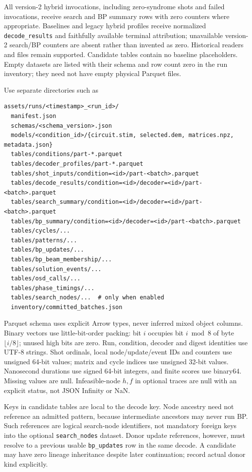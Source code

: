 \documentclass[11pt,a4paper]{article}
\newcommand{\code}[1]{\nolinkurl{#1}}
\begin{document}
All version-2 hybrid invocations, including zero-syndrome shots and failed invocations, receive search and BP summary rows with zero counters where appropriate. Baselines and legacy hybrid profiles receive normalized \code{decode_results} and faithfully available terminal attribution; unavailable version-2 search/BP counters are absent rather than invented as zero. Historical readers and files remain supported. Candidate tables contain no baseline placeholders. Empty datasets are listed with their schema and row count zero in the run inventory; they need not have empty physical Parquet files.

Use separate directories such as

\begin{minipage}{\linewidth}
\begin{lstlisting}
assets/runs/<timestamp>_<run_id>/
  manifest.json
  schemas/<schema_version>.json
  models/<condition_id>/{circuit.stim, selected.dem, matrices.npz, metadata.json}
  tables/conditions/part-*.parquet
  tables/decoder_profiles/part-*.parquet
  tables/shot_inputs/condition=<id>/part-<batch>.parquet
  tables/decode_results/condition=<id>/decoder=<id>/part-<batch>.parquet
  tables/search_summary/condition=<id>/decoder=<id>/part-<batch>.parquet
  tables/bp_summary/condition=<id>/decoder=<id>/part-<batch>.parquet
  tables/cycles/...
  tables/patterns/...
  tables/bp_updates/...
  tables/bp_beam_membership/...
  tables/solution_events/...
  tables/osd_calls/...
  tables/phase_timings/...
  tables/search_nodes/...  # only when enabled
  inventory/committed_batches.json
\end{lstlisting}
\end{minipage}

Parquet schema uses explicit Arrow types, never inferred mixed object columns. Binary vectors use little-bit-order packing: bit $i$ occupies bit $i\bmod8$ of byte $\lfloor i/8\rfloor$; unused high bits are zero. Run, condition, decoder and digest identities use UTF-8 strings. Shot ordinals, local node/update/event IDs and counters use unsigned 64-bit values; matrix and cycle indices use unsigned 32-bit values. Nanosecond durations use signed 64-bit integers, and finite scores use binary64. Missing values are null. Infeasible-node $h,f$ in optional traces are null with an explicit status, not JSON Infinity or NaN.

Keys in candidate tables are local to the decode key. Node ancestry need not reference an admitted pattern, because intermediate ancestors may never run BP. Such references are logical search-node identifiers, not mandatory foreign keys into the optional \code{search_nodes} dataset. Donor update references, however, must resolve to a previous usable \code{bp_updates} row in the same decode. A candidate may have zero lineage inheritance despite later continuation; record actual donor kind explicitly.
\end{document}
